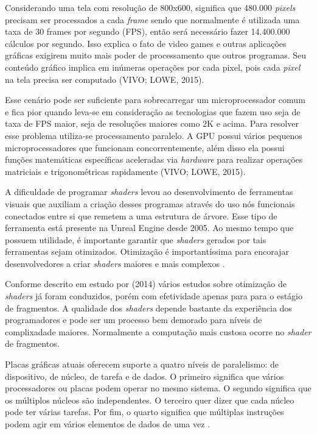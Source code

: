 Considerando uma tela com resolução de 800x600, significa que 480.000 \textit{pixels} precisam ser processados a cada \textit{frame} sendo que normalmente é utilizada uma taxa de 30 frames por segundo (\acrshort{FPS}), então será necessário fazer 14.400.000 cálculos por segundo. Isso explica o fato de video games e outras aplicações gráficas exigirem muito mais poder de processamento que outros programas. Seu conteúdo gráfico implica em inúmeras operações por cada pixel, pois cada \textit{pixel} na tela precisa ser computado (VIVO; LOWE, 2015)\nocite{bookOfShaders}.  

Esse cenário pode ser suficiente para sobrecarregar um microprocessador comum e fica pior quando leva-se em consideração as tecnologias que fazem uso seja de taxa de FPS maior, seja de resoluções maiores como 2K e acima. Para resolver esse problema utiliza-se processamento paralelo. A GPU possui vários pequenos microprocessadores que funcionam concorrentemente, além disso ela possui funções matemáticas específicas aceleradas via \textit{hardware} para realizar operações matriciais e trigonométricas rapidamente (VIVO; LOWE, 2015)\nocite{bookOfShaders}.

A dificuldade de programar \textit{shaders} levou ao desenvolvimento de ferramentas visuais que auxiliam a criação desses programas através do uso nós funcionais conectados entre si que remetem a uma estrutura de árvore. Esse tipo de ferramenta está presente na Unreal Engine desde 2005. Ao mesmo tempo que possuem utilidade, é importante garantir que \textit{shaders} gerados por tais ferramentas sejam otimizados. Otimização é importantíssima para encorajar desenvolvedores a criar \textit{shaders} maiores e mais complexos \cite{jensen2007shader}.

Conforme descrito em estudo por  (2014) vários estudos sobre otimização de \textit{shaders} já foram conduzidos, porém com efetividade apenas para para o estágio de fragmentos. A qualidade dos \textit{shaders} depende bastante da experiência dos programadores e pode ser um processo bem demorado para níveis de complixadade maiores. Normalmente a computação mais custosa ocorre no \textit{shader} de fragmentos. 

Placas gráficas atuais oferecem suporte a quatro níveis de paralelismo: de dispositivo, de núcleo, de tarefa e de dados. O primeiro significa que vários processadores ou placas podem operar no mesmo sistema. O segundo significa que os múltiplos núcleos são independentes. O terceiro quer dizer que cada núcleo pode ter várias tarefas. Por fim, o quarto significa que múltiplas instruções podem agir em vários elementos de dados de uma vez \cite{hasu2018modern}.

